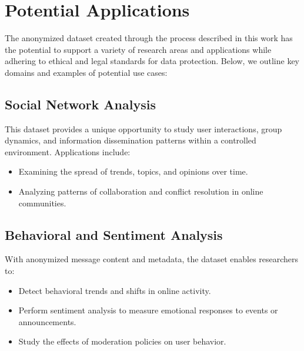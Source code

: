 







\iffalse

\section{Potential Applications}

The anonymized dataset created through the process described in this work has the potential to support a variety of research areas and applications while adhering to ethical and legal standards for data protection. Below, we outline key domains and examples of potential use cases:

\subsection{Social Network Analysis}
This dataset provides a unique opportunity to study user interactions, group dynamics, and information dissemination patterns within a controlled environment. Applications include:
\begin{itemize}
    \item Examining the spread of trends, topics, and opinions over time.
    \item Analyzing patterns of collaboration and conflict resolution in online communities.
\end{itemize}

\subsection{Behavioral and Sentiment Analysis}
With anonymized message content and metadata, the dataset enables researchers to:
\begin{itemize}
    \item Detect behavioral trends and shifts in online activity.
    \item Perform sentiment analysis to measure emotional responses to events or announcements.
    \item Study the effects of moderation policies on user behavior.
\end{itemize}

